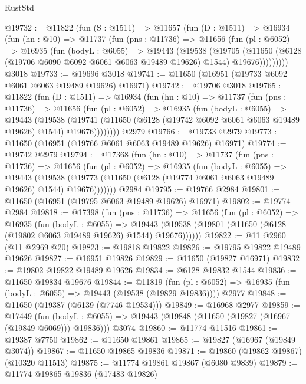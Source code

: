 \begin{lexlean}{RustStd}
\begin{coremodule}
@19732 := @11822
    (fun (S : @1511) =>
    @11657
      (fun (D : @1511) =>
      @16934
        (fun (hn : @10) =>
        @11737
          (fun (pns : @11736) =>
          @11656
            (fun (pl : @6052) =>
            @16935
              (fun (bodyL : @6055) =>
              @19443
                (@19538
                  (@19705
                    (@11650
                      (@6128 (@19706 @6090 @6092 @6061 @6063 @19489 @19626) @1544)
                      @19676)))))))))
    @3018
@19733 := @19696 @3018
@19741 := @11650 (@16951 (@19733 @6092 @6061 @6063 @19489 @19626) @16971)
@19742 := @19706 @3018
@19765 := @11822
    (fun (D : @1511) =>
    @16934
      (fun (hn : @10) =>
      @11737
        (fun (pns : @11736) =>
        @11656
          (fun (pl : @6052) =>
          @16935
            (fun (bodyL : @6055) =>
            @19443
              (@19538
                (@19741
                  (@11650 (@6128 (@19742 @6092 @6061 @6063 @19489 @19626) @1544) @19676))))))))
    @2979
@19766 := @19733 @2979
@19773 := @11650 (@16951 (@19766 @6061 @6063 @19489 @19626) @16971)
@19774 := @19742 @2979
@19794 := @17368
    (fun (hn : @10) =>
    @11737
      (fun (pns : @11736) =>
      @11656
        (fun (pl : @6052) =>
        @16935
          (fun (bodyL : @6055) =>
          @19443
            (@19538 (@19773 (@11650 (@6128 (@19774 @6061 @6063 @19489 @19626) @1544) @19676)))))))
    @2984
@19795 := @19766 @2984
@19801 := @11650 (@16951 (@19795 @6063 @19489 @19626) @16971)
@19802 := @19774 @2984
@19818 := @17398
    (fun (pns : @11736) =>
    @11656
      (fun (pl : @6052) =>
      @16935
        (fun (bodyL : @6055) =>
        @19443 (@19538 (@19801 (@11650 (@6128 (@19802 @6063 @19489 @19626) @1544) @19676))))))
@19822 := @11 @2960 (@11 @2969 @20)
@19823 := @19818 @19822
@19826 := @19795 @19822 @19489 @19626
@19827 := @16951 @19826
@19829 := @11650 (@19827 @16971)
@19832 := @19802 @19822 @19489 @19626
@19834 := @6128 @19832 @1544
@19836 := @11650 @19834 @19676
@19844 := @11819
    (fun (pl : @6052) => @16935 (fun (bodyL : @6055) => @19443 (@19538 (@19829 @19836))))
    @2977
@19848 := @11650 (@19387 (@6139 (@7746 @19534)))
@19849 := @16968 @2977
@19859 := @17449
    (fun (bodyL : @6055) => @19443 (@19848 (@11650 (@19827 (@16967 (@19849 @6069))) @19836)))
    @3074
@19860 := @11774 @11516
@19861 := @19387 @7750
@19862 := @11650 @19861
@19865 := @19827 (@16967 (@19849 @3074))
@19867 := @11650 @19865 @19836
@19871 := @19860 (@19862 @19867) (@10320 @11513)
@19875 := @11774 @19861 @19867 (@6080 @9839)
@19879 := @11774 @19865 @19836 (@17483 @19826)

\end{coremodule}
\end{lexlean}
